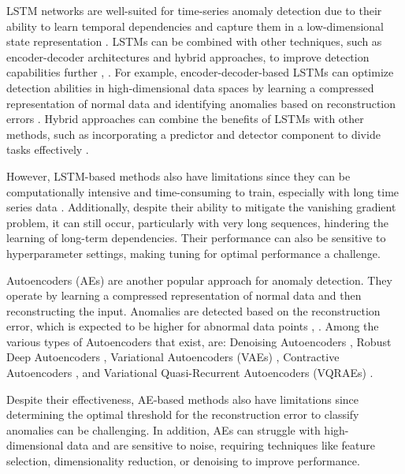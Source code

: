 \documentclass[conference]{IEEEtran}
\begin{document}
LSTM networks are well-suited for time-series anomaly detection due to their ability to learn temporal dependencies and capture them in a low-dimensional state representation \cite{HOJJATI2024106106,10744017}. LSTMs can be combined with other techniques, such as encoder-decoder architectures and hybrid approaches, to improve detection capabilities further \cite{SGUEGLIA2022170}, \cite{HOJJATI2024106106}. For example, encoder-decoder-based LSTMs can optimize detection abilities in high-dimensional data spaces by learning a compressed representation of normal data and identifying anomalies based on reconstruction errors \cite{SGUEGLIA2022170,aerospace6110117}. Hybrid approaches can combine the benefits of LSTMs with other methods, such as incorporating a predictor and detector component to divide tasks effectively \cite{SGUEGLIA2022170}.

However, LSTM-based methods also have limitations since they can be computationally intensive and time-consuming to train, especially with long time series data \cite{8926446,HOJJATI2024106106}. Additionally, despite their ability to mitigate the vanishing gradient problem, it can still occur, particularly with very long sequences, hindering the learning of long-term dependencies. Their performance can also be sensitive to hyperparameter settings, making tuning for optimal performance a challenge.

Autoencoders (AEs) are another popular approach for anomaly detection. They operate by learning a compressed representation of normal data and then reconstructing the input. Anomalies are detected based on the reconstruction error, which is expected to be higher for abnormal data points \cite{10.1145/3444690}, \cite{10.1007/978-3-030-73100-7_60}. Among the various types of Autoencoders that exist, are:
Denoising Autoencoders \cite{s23052844,10.1145/3691338},
Robust Deep Autoencoders \cite{10.1145/3691338},
Variational Autoencoders (VAEs) \cite{9523565},
Contractive Autoencoders  \cite{SGUEGLIA2022170},
and Variational Quasi-Recurrent Autoencoders (VQRAEs) \cite{8079887}.

Despite their effectiveness, AE-based methods also have limitations since	determining the optimal threshold for the reconstruction error to classify anomalies can be challenging. In addition, AEs can struggle with high-dimensional data and are sensitive to noise, requiring techniques like feature selection, dimensionality reduction, or denoising to improve performance.
 
\end{document}
